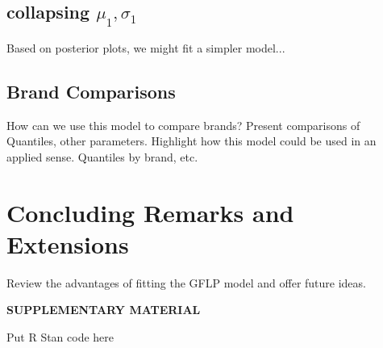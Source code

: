 \documentclass[12pt]{article}
\begin{document}
\subsection{collapsing $\mu_1, \sigma_1$}
Based on posterior plots, we might fit a simpler model...
\subsection{Brand Comparisons}
How can we use this model to compare brands?  Present comparisons of Quantiles, other parameters.  Highlight how this model could be used in an applied sense. Quantiles by brand, etc.
\section{Concluding Remarks and Extensions}
Review the advantages of fitting the GFLP model and offer future ideas.  




    


\bigskip
\begin{center}
{\large\bf SUPPLEMENTARY MATERIAL}
\end{center}

\begin{description}

\item Put R Stan code here

\end{description}



\end{document}
